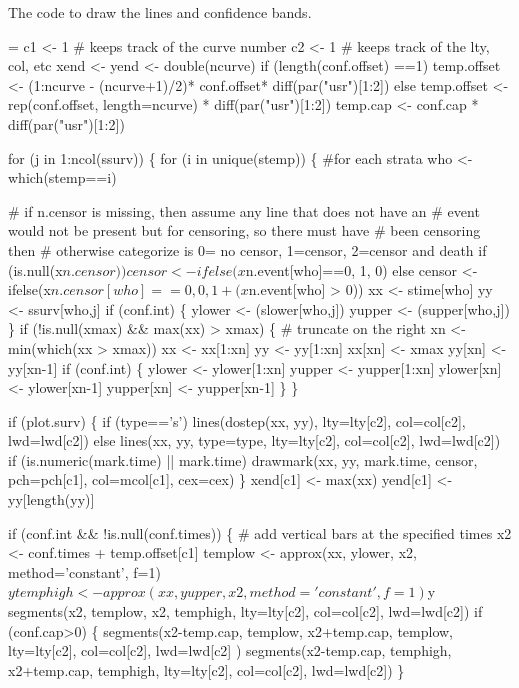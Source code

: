 \documentclass{article}
\begin{document}
The code to draw the lines and confidence bands.
\begin{nwchunk}
=
 c1 <- 1  # keeps track of the curve number
 c2 <- 1  # keeps track of the lty, col, etc
 xend <- yend <- double(ncurve)
 if (length(conf.offset) ==1) 
     temp.offset <- (1:ncurve - (ncurve+1)/2)* conf.offset* diff(par("usr")[1:2])
 else temp.offset <- rep(conf.offset, length=ncurve) *  diff(par("usr")[1:2])
 temp.cap    <-  conf.cap    * diff(par("usr")[1:2])
 
 for (j in 1:ncol(ssurv)) \{
     for (i in unique(stemp)) \{  #for each strata
         who <- which(stemp==i)
 
         # if n.censor is missing, then assume any line that does not have an
         #   event would not be present but for censoring, so there must have
         #   been censoring then
         # otherwise categorize is 0= no censor, 1=censor, 2=censor and death
         if (is.null(x$n.censor)) censor <- ifelse(x$n.event[who]==0, 1, 0)
         else censor <- ifelse(x$n.censor[who]==0, 0, 1 + (x$n.event[who] > 0))
         xx <- stime[who]
         yy <- ssurv[who,j]
         if (conf.int) \{
             ylower <- (slower[who,j])
             yupper <- (supper[who,j])
         \}
         if (!is.null(xmax) && max(xx) > xmax) \{  # truncate on the right
             xn <- min(which(xx > xmax))
             xx <- xx[1:xn]
             yy <- yy[1:xn]
             xx[xn] <- xmax
             yy[xn] <- yy[xn-1]
             if (conf.int) \{
                 ylower <- ylower[1:xn]
                 yupper <- yupper[1:xn]
                 ylower[xn] <- ylower[xn-1]
                 yupper[xn] <- yupper[xn-1]
             \}
         \}
             
 
         if (plot.surv) \{
             if (type=='s')
                 lines(dostep(xx, yy), lty=lty[c2], col=col[c2], lwd=lwd[c2]) 
             else lines(xx, yy, type=type, lty=lty[c2], col=col[c2], lwd=lwd[c2])
             if (is.numeric(mark.time) || mark.time) 
                 drawmark(xx, yy, mark.time, censor, pch=pch[c1], col=mcol[c1],
                          cex=cex)
         \}
         xend[c1] <- max(xx)
         yend[c1] <- yy[length(yy)]
 
         if (conf.int && !is.null(conf.times)) \{
             # add vertical bars at the specified times
             x2 <- conf.times + temp.offset[c1]
             templow <- approx(xx, ylower, x2,
                               method='constant', f=1)$y
             temphigh<- approx(xx, yupper, x2,
                               method='constant', f=1)$y
             segments(x2, templow, x2, temphigh,
                       lty=lty[c2], col=col[c2], lwd=lwd[c2])
             if (conf.cap>0) \{
                 segments(x2-temp.cap, templow, x2+temp.cap, templow,
                          lty=lty[c2], col=col[c2], lwd=lwd[c2] )
                 segments(x2-temp.cap, temphigh, x2+temp.cap, temphigh,
                           lty=lty[c2], col=col[c2], lwd=lwd[c2])
             \}
            

\end{nwchunk}
\end{document}
